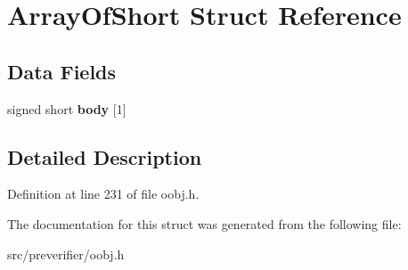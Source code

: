 \section{ArrayOfShort Struct Reference}
\label{struct_array_of_short}
\subsection*{Data Fields}
\begin{DoxyCompactItemize}
\item 
signed short {\bfseries body} [1]\label{struct_array_of_short_af35602b6939dd34f8ba19e480a24fab3}

\end{DoxyCompactItemize}


\subsection{Detailed Description}


Definition at line 231 of file oobj.h.



The documentation for this struct was generated from the following file:\begin{DoxyCompactItemize}
\item 
src/preverifier/oobj.h\end{DoxyCompactItemize}
